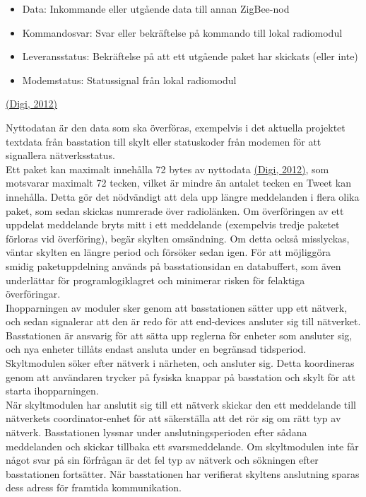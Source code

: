 \documentclass[a4paper,11pt]{article}
\begin{document}
	\begin{itemize}
    	\item Data: Inkommande eller utgående data till annan ZigBee-nod
    	\item Kommandosvar: Svar eller bekräftelse på kommando till lokal radiomodul
    	\item Leveransstatus: Bekräftelse på att ett utgående paket har skickats (eller inte)
    	\item Modemstatus: Statussignal från lokal radiomodul
    	\end{itemize}
\hyperref[digi]{(Digi, 2012)}

Nyttodatan är den data som ska överföras, exempelvis i det aktuella projektet textdata från basstation till skylt eller statuskoder från modemen för att signallera nätverksstatus. \\

Ett paket kan maximalt innehålla 72 bytes av nyttodata \hyperref[digi]{(Digi, 2012)}, som motsvarar maximalt 72 tecken, vilket är mindre än antalet tecken en Tweet kan innehålla. Detta gör det nödvändigt att dela upp längre meddelanden i flera olika paket, som sedan skickas numrerade över radiolänken. Om överföringen av ett uppdelat meddelande bryts mitt i ett meddelande (exempelvis tredje paketet förloras vid överföring), begär skylten omsändning. Om detta också misslyckas, väntar skylten en längre period och försöker sedan igen. För att möjliggöra smidig paketuppdelning används på basstationsidan en databuffert, som även underlättar för programlogiklagret och minimerar risken för felaktiga överföringar. \\

Ihopparningen av moduler sker genom att basstationen sätter upp ett nätverk, och sedan signalerar att den är redo för att end-devices ansluter sig till nätverket. Basstationen är ansvarig för att sätta upp reglerna för enheter som ansluter sig, och nya enheter tillåts endast ansluta under en begränsad tidsperiod. Skyltmodulen söker efter nätverk i närheten, och ansluter sig. Detta koordineras genom att användaren trycker på fysiska knappar på basstation och skylt för att starta ihopparningen. \\

När skyltmodulen har anslutit sig till ett nätverk skickar den ett meddelande till nätverkets coordinator-enhet för att säkerställa att det rör sig om rätt typ av nätverk. Basstationen lyssnar under anslutningsperioden efter sådana meddelanden och skickar tillbaka ett svarsmeddelande. Om skyltmodulen inte får något svar på sin förfrågan är det fel typ av nätverk och sökningen efter basstationen fortsätter. När basstationen har verifierat skyltens anslutning sparas dess adress för framtida kommunikation. \\
\end{document}

